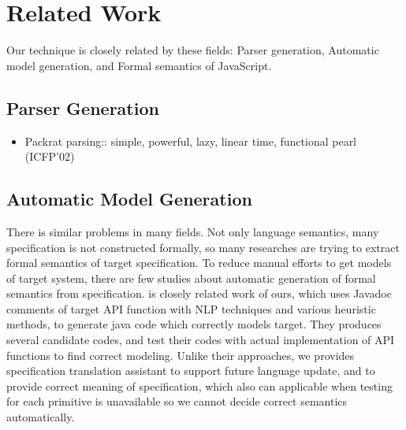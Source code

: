\section{Related Work}

Our technique is closely related by these fields: Parser generation, Automatic model generation, and Formal semantics of JavaScript.
\subsection{Parser Generation}
\begin{itemize}
  \item Packrat parsing:: simple, powerful, lazy, linear time, functional pearl (ICFP'02)~\cite{packrat}
\end{itemize}

\subsection{Automatic Model Generation}
There is similar problems in many fields. Not only language semantics, many specification is not constructed formally, so many researches are trying to
extract formal semantics of target specification. To reduce manual efforts to get models of target system, there are few studies about automatic generation of
formal semantics from specification. \cite{javadoc} is closely related work of ours, which uses Javadoc comments of target API function with NLP techniques and various
heuristic methods, to generate java code which correctly models target. They produces several candidate codes, and test their codes with actual implementation of API functions
to find correct modeling. Unlike their approaches, we provides specification translation assistant to support future language update, and to provide correct meaning of specification, which also can applicable when
testing for each primitive is unavailable so we cannot decide correct semantics automatically.


